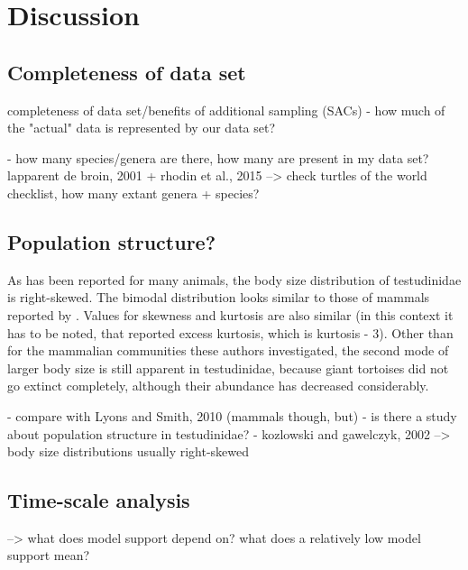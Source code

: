 \section{Discussion}

\subsection{Completeness of data set}

completeness of data set/benefits of additional sampling (SACs)
- how much of the "actual" data is represented by our data set?

- how many species/genera are there, how many are present in my data set?
lapparent de broin, 2001 + rhodin et al., 2015
--> check turtles of the world checklist, how many extant genera + species?


\subsection{Population structure?}

As has been reported for many animals, the body size distribution of testudinidae is right-skewed. 
The bimodal distribution looks similar to those of mammals reported by \cite{Lyons2008}. Values for skewness and kurtosis are also similar  (in this context it has to be noted, that \cite{Lyons2008} reported excess kurtosis, which is kurtosis - 3).
Other than for the mammalian communities these authors investigated, the second mode of larger body size is still apparent in testudinidae, because giant tortoises did not go extinct completely, although their abundance has decreased considerably.

- compare with Lyons and Smith, 2010 (mammals though, but)
- is there a study about population structure in testudinidae?
- kozlowski and gawelczyk, 2002 --> body size distributions usually right-skewed

\subsection{Time-scale analysis}

--> what does model support depend on? what does a relatively low model support mean?




